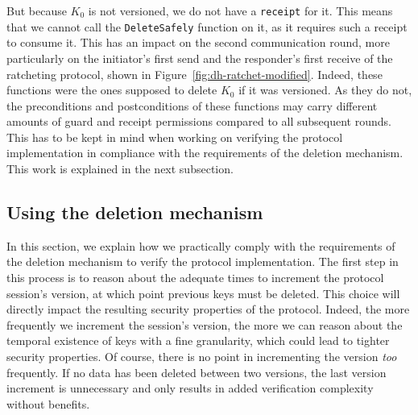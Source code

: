 But because $K_0$ is not versioned, we do not have a \texttt{receipt} for it.
This means that we cannot call the \texttt{DeleteSafely} function on it, as it requires such a receipt to consume it.
This has an impact on the second communication round, more particularly on the initiator's first send and the responder's first receive of the ratcheting protocol, shown in Figure~\ref{fig:dh-ratchet-modified}.
Indeed, these functions were the ones supposed to delete $K_0$ if it was versioned.
As they do not, the preconditions and postconditions of these functions may carry different amounts of guard and receipt permissions compared to all subsequent rounds.
This has to be kept in mind when working on verifying the protocol implementation in compliance with the requirements of the deletion mechanism.
This work is explained in the next subsection.

\subsection{Using the deletion mechanism}

In this section, we explain how we practically comply with the requirements of the deletion mechanism to verify the protocol implementation.
The first step in this process is to reason about the adequate times to increment the protocol session's version, at which point previous keys must be deleted.
This choice will directly impact the resulting security properties of the protocol.
Indeed, the more frequently we increment the session's version, the more we can reason about the temporal existence of keys with a fine granularity, which could lead to tighter security properties.
Of course, there is no point in incrementing the version \emph{too} frequently.
If no data has been deleted between two versions, the last version increment is unnecessary and only results in added verification complexity without benefits.

